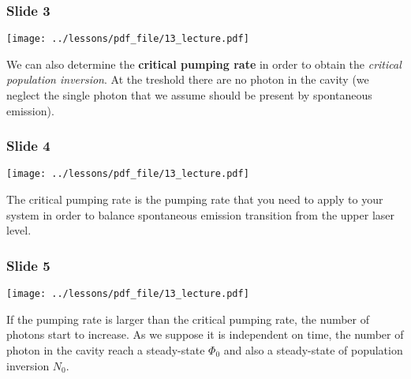 \documentclass[../main/main.tex]{subfiles}
\begin{document}
\subsubsection*{Slide 3}

\begin{minipage}[]{0.5\linewidth}
\centering
\texttt{[image: ../lessons/pdf\_file/13\_lecture.pdf]}
\end{minipage}
\hspace{0.3cm}\vspace{0.3cm}
\begin{minipage}[c]{0.47\linewidth}

We can also determine the \textbf{critical pumping rate} in order to obtain the \emph{critical population inversion}. At the treshold there are no photon in the cavity (we neglect the single photon that we assume should be present by spontaneous emission).

\end{minipage}

\newpage

\subsubsection*{Slide 4}

\begin{minipage}[]{0.5\linewidth}
\centering
\texttt{[image: ../lessons/pdf\_file/13\_lecture.pdf]}
\end{minipage}
\hspace{0.3cm}\vspace{0.3cm}
\begin{minipage}[c]{0.47\linewidth}

The critical pumping rate is the pumping rate that you need to apply to your system in order to balance spontaneous emission transition from the upper laser level.

\end{minipage}

\subsubsection*{Slide 5}

\begin{minipage}[]{0.5\linewidth}
\centering
\texttt{[image: ../lessons/pdf\_file/13\_lecture.pdf]}
\end{minipage}
\hspace{0.3cm}\vspace{0.3cm}
\begin{minipage}[c]{0.47\linewidth}

If the pumping rate is larger than the critical pumping rate, the number of photons start to increase.
As we suppose it is independent on time, the number of photon in the cavity reach a steady-state \( \Phi _0 \) and also a steady-state of population inversion \( N_0 \).

\end{minipage}
\end{document}
